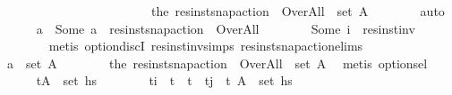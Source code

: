 \begin{isabellebody}
\ \ \ \ \ \ \ \ \ \ \ \ \ \ \ \ \ \ \ \ \ \ \ \ {\isachardoublequoteopen}the\ {\isacharparenleft}{\kern0pt}res{\isacharunderscore}{\kern0pt}inst{\isacharunderscore}{\kern0pt}snap{\isacharunderscore}{\kern0pt}action\ {\isasympi}\ Over{\isacharunderscore}{\kern0pt}All{\isacharparenright}{\kern0pt}\ {\isasymin}\ set\ A{\isachardoublequoteclose}\isanewline
\ \ \ \ \ \ \isamarkupfalse%
\ auto\isanewline
\ \ \ \ \isamarkupfalse%
\ a\ \ {\isachardoublequoteopen}Some\ a\ {\isacharequal}{\kern0pt}\ res{\isacharunderscore}{\kern0pt}inst{\isacharunderscore}{\kern0pt}snap{\isacharunderscore}{\kern0pt}action\ {\isasympi}\ Over{\isacharunderscore}{\kern0pt}All{\isachardoublequoteclose}\isanewline
\ \ \ \ \ \ \isamarkupfalse%
\ {\isacartoucheopen}Some\ i\ {\isacharequal}{\kern0pt}\ res{\isacharunderscore}{\kern0pt}inst{\isacharunderscore}{\kern0pt}inv\ {\isasympi}{\isacartoucheclose}\isanewline
\ \ \ \ \ \ \isamarkupfalse%
\ {\isacharparenleft}{\kern0pt}metis\ option{\isachardot}{\kern0pt}discI\ res{\isacharunderscore}{\kern0pt}inst{\isacharunderscore}{\kern0pt}inv{\isachardot}{\kern0pt}simps{\isacharparenleft}{\kern0pt}{}{\isacharparenright}{\kern0pt}\ res{\isacharunderscore}{\kern0pt}inst{\isacharunderscore}{\kern0pt}snap{\isacharunderscore}{\kern0pt}action{\isachardot}{\kern0pt}elims{\isacharparenright}{\kern0pt}\isanewline
\ \ \ \ \isamarkupfalse%
\ \isamarkupfalse%
\ {\isachardoublequoteopen}a\ {\isasymin}\ set\ A{\isachardoublequoteclose}\isanewline
\ \ \ \ \ \ \isamarkupfalse%
\ {\isacartoucheopen}the\ {\isacharparenleft}{\kern0pt}res{\isacharunderscore}{\kern0pt}inst{\isacharunderscore}{\kern0pt}snap{\isacharunderscore}{\kern0pt}action\ {\isasympi}\ Over{\isacharunderscore}{\kern0pt}All{\isacharparenright}{\kern0pt}\ {\isasymin}\ set\ A{\isacartoucheclose}\ \isamarkupfalse%
\ {\isacharparenleft}{\kern0pt}metis\ option{\isachardot}{\kern0pt}sel{\isacharparenright}{\kern0pt}\isanewline
\isanewline
\ \ \ \ \isamarkupfalse%
\ {\isachardoublequoteopen}{\isacharparenleft}{\kern0pt}t{\isacharcomma}{\kern0pt}A{\isacharparenright}{\kern0pt}\ {\isasymin}\ set\ {\isacharquery}{\kern0pt}hs{\isacharprime}{\kern0pt}{\isachardoublequoteclose}\isanewline
\ \ \ \ \ \ \isamarkupfalse%
\ {\isacartoucheopen}t\isactrlsub i\ {\isacharless}{\kern0pt}\ t\ {\isasymand}\ t\ {\isacharless}{\kern0pt}\ t\isactrlsub j{\isacartoucheclose}\ \ {\isacartoucheopen}{\isacharparenleft}{\kern0pt}t{\isacharcomma}{\kern0pt}\ A{\isacharparenright}{\kern0pt}\ {\isasymin}\ set\ hs{\isacartoucheclose}\ \isanewline

\end{isabellebody}
